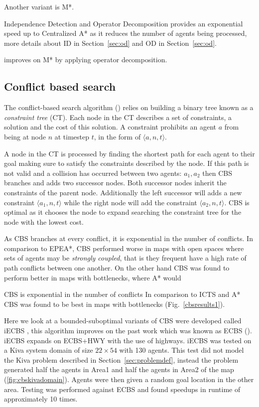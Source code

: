 \documentclass[a4paper,11pt]{article}
\begin{document}
Another variant is M*.

Independence Detection and Operator Decomposition provides an exponential speed up to Centralized A* as it reduces the number of agents being processed, more details about ID in Section~\ref{sec:od} and OD in Section~\ref{sec:od}.

\cite{ferner2013odrm} improves on M* by applying operator decomposition.

\subsection{Conflict based search} \label{sec:cbs}
The conflict-based search algorithm (\cite{sharon2015conflict}) relies on building a binary tree known as a  \textit{constraint tree} (CT). Each node in the CT describes a set of constraints, a solution and the cost of this solution. A constraint prohibits an agent $a$ from being at node $n$ at timestep $t$, in the form of $\langle a, n, t \rangle$.

A node in the CT is processed by finding the shortest path for each agent to their goal making sure to satisfy the constraints described by the node. If this path is not valid and a collision has occurred between two agents: $a_1, a_2$ then CBS branches and adds two successor nodes. Both successor nodes inherit the constraints of the parent node. Additionally the left successor will adds a new constraint $\langle a_1, n, t \rangle$ while the right node will add the constraint $\langle a_2, n, t \rangle$. CBS is optimal as it chooses the node to expand searching the constraint tree for the node with the lowest cost.

As CBS branches at every conflict, it is exponential in the number of conflicts. In comparison to EPEA*, CBS performed worse in maps with open spaces where sets of agents may be \textit{strongly coupled}, that is they frequent have a high rate of path conflicts between one another. On the other hand CBS was found to perform better in maps with bottlenecks, where A* would 


CBS is exponential in the number of conflicts In comparison to ICTS and A* CBS was found to be best in maps with bottlenecks (Fig.~\ref{cbsresults1}).

Here we look at a bounded-suboptimal variants of CBS were developed called iECBS \cite{cohen2016improved}, this algorithm improves on the past work which was known as ECBS (\cite{barer2014suboptimal}). iECBS expands on ECBS+HWY with the use of highways. iECBS was tested on a Kiva system domain of size $22 \times 54$ with 130 agents. This test did not model the Kiva problem described in Section~\ref{sec:problemdef}, instead the problem generated half the agents in Area1 and half the agents in Area2 of the map (\ref{fig:cbskivadomain}). Agents were then given a random goal location in the other area. Testing was performed against ECBS and found speedups in runtime of approximately 10 times.
\end{document}
